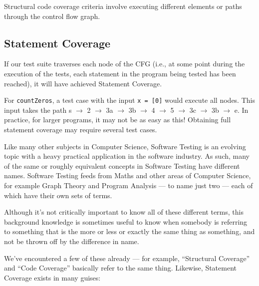 Structural code coverage criteria involve executing different elements or paths
through the control flow graph.

\subsection{Statement Coverage} 

If our test suite traverses each node of the CFG (i.e., at some point during the
execution of the tests, each statement in the program being tested has been
reached), it will have achieved Statement Coverage. 


For {\tt countZeros}, a test case with the input {\tt x = [0]} would execute all
nodes. This input takes the path s $\rightarrow$ 2 $\rightarrow$ 3a
$\rightarrow$ 3b $\rightarrow$ 4 $\rightarrow$ 5 $\rightarrow$ 3c $\rightarrow$
3b $\rightarrow$ e. In practice, for larger programs, it may not be as easy as
this! Obtaining full statement coverage may require several test cases. 
    

Like many other subjects in Computer Science, Software Testing is an evolving
topic with a heavy practical application in the software industry. As such, many
of the same or roughly equivalent concepts in Software Testing have different
names. Software Testing feeds from Maths and other areas of Computer Science,
for example Graph Theory and Program Analysis --- to name just two --- each of
which have their own sets of terms.

Although it's not critically important to know all of these different terms,
this background knowledge is sometimes useful to know when somebody is referring
to something that is the more or less or exactly the same thing as something,
and not be thrown off by the difference in name. 

We've encountered a few of these already --- for example, ``Structural
Coverage'' and ``Code Coverage'' basically refer to the same thing. Likewise,
Statement Coverage exists in many guises:



